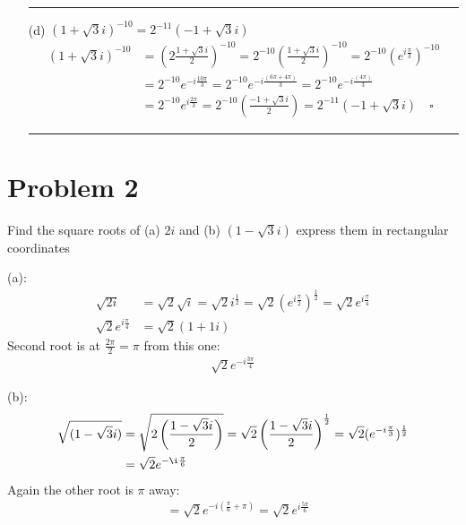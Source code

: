 \documentclass{article}
\begin{document}
\begin{enumerate}
\begin{align*}
  \end{align*}
\hrule
\item[(d)] $(1 + \sqrt{3}i)^{-10}= 2^{-11}(-1 + \sqrt{3}i)$
  \begin{align*}
    (1 + \sqrt{3}i)^{-10} &= \left(2 \frac{1 + \sqrt{3}i}{2}\right)^{-10} = 2^{-10}\left( \frac{1 + \sqrt{3}i}{2}\right)^{-10} = 2^{-10}\left(e^{i\frac{\pi}{3}}\right)^{-10} \\
                          &= 2^{-10}e^{-i\frac{10\pi}{3}} = 2^{-10}e^{-i\frac{(6\pi + 4\pi)}{3}} = 2^{-10}e^{-i\frac{(4\pi)}{3}} \\
                          &= 2^{-10}e^{i\frac{2\pi}{3}} = 2^{-10}\left(\frac{-1 + \sqrt{3}i}{2}\right) = 2^{-11}(-1 + \sqrt{3}i)
                            \quad \square
  \end{align*}
\hrule
\end{enumerate}

\vspace{.5cm} %


\newpage
\section*{Problem 2}
Find the square roots of (a) $2i$ and (b) $(1-\sqrt{3}i)$ express them in rectangular coordinates

(a):
\begin{align*}
  \sqrt{2i} &= \sqrt{2}\sqrt{i} = \sqrt{2}i^{\frac{1}{2}} = \sqrt{2} (e^{i\frac{\pi}{2}})^{\frac{1}{2}} = \sqrt{2}e^{i\frac{\pi}{4}} \\
  \sqrt{2}e^{i\frac{\pi}{4}} &= \sqrt{2}(1+1i)
\end{align*}
Second root is at $\frac{2\pi}{2} = \pi$ from this one:
\begin{align*}
\sqrt{2}e^{-i\frac{3\pi}{4}}
\end{align*}

(b):
\begin{align*}
  \sqrt{(1-\sqrt{3}i)} &=  \sqrt{2\left(\frac{1-\sqrt{3}i}{2}\right)} = \sqrt{2}\left(\frac{1-\sqrt{3}i}{2}\right)^{\frac{1}{2}} = \sqrt{2} (e^{-i\frac{\pi}{3}})^{\frac{1}{2}} \\
  &= \sqrt{2}e^{-\i\frac{\pi}{6}} 
\end{align*}
Again the other root is $\pi$ away:
\begin{align*}
  &= \sqrt{2}e^{-i(\frac{\pi}{6} + \pi)} = \sqrt{2}e^{i\frac{5\pi}{6}}
\end{align*}
\newpage
\end{document}
